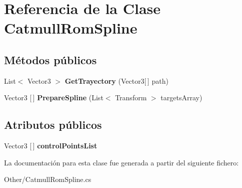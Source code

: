 \hypertarget{class_catmull_rom_spline}{}\section{Referencia de la Clase Catmull\+Rom\+Spline}
\label{class_catmull_rom_spline}
\subsection*{Métodos públicos}
\begin{DoxyCompactItemize}
\item 
\mbox{\label{class_catmull_rom_spline_a3d1f936cf80fb6177e2fb598c8cd6adf}} 
List$<$ Vector3 $>$ {\bfseries Get\+Trayectory} (Vector3\mbox{[}$\,$\mbox{]} path)
\item 
\mbox{\label{class_catmull_rom_spline_a99e5a690f95ef08186b9b785baf13a50}} 
Vector3 \mbox{[}$\,$\mbox{]} {\bfseries Prepare\+Spline} (List$<$ Transform $>$ targets\+Array)
\end{DoxyCompactItemize}
\subsection*{Atributos públicos}
\begin{DoxyCompactItemize}
\item 
\mbox{\label{class_catmull_rom_spline_a849ca4b6ac6f852a463a800430daf777}} 
Vector3 \mbox{[}$\,$\mbox{]} {\bfseries control\+Points\+List}
\end{DoxyCompactItemize}


La documentación para esta clase fue generada a partir del siguiente fichero\+:\begin{DoxyCompactItemize}
\item 
Other/Catmull\+Rom\+Spline.\+cs\end{DoxyCompactItemize}
